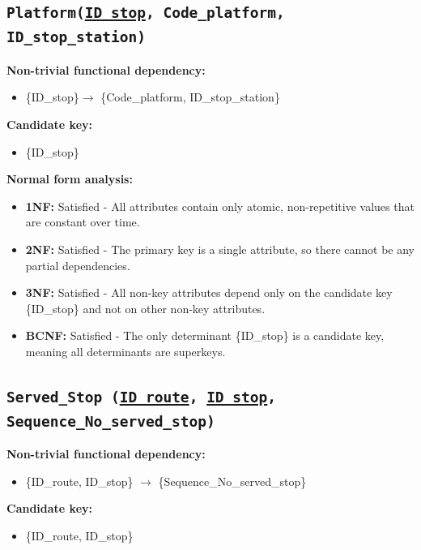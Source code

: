 \documentclass[a4paper, 12pt]{article}
\begin{document}
\subsection{\texttt{{Platform}(\underline{ID\_stop}, Code\_platform, ID\_stop\_station)}}
\textbf{Non-trivial functional dependency:}
\begin{itemize}
    \item \{ID\_stop\}$\rightarrow$ \{Code\_platform, ID\_stop\_station\}
\end{itemize}

\textbf{Candidate key:}
\begin{itemize}
    \item \{ID\_stop\}
\end{itemize}

\textbf{Normal form analysis:}
\begin{itemize}
    \item \textbf{1NF:} Satisfied - All attributes contain only atomic, non-repetitive values that are constant over time.
    
    \item \textbf{2NF:} Satisfied - The primary key is a single attribute, so there cannot be any partial dependencies.
    
    \item \textbf{3NF:} Satisfied - All non-key attributes depend only on the candidate key \{ID\_stop\} and not on other non-key attributes.
    
    \item \textbf{BCNF:} Satisfied - The only determinant \{ID\_stop\} is a candidate key, meaning all determinants are superkeys.
\end{itemize}

\subsection{\texttt{{Served\_Stop} (\underline{ID\_route}, \underline{ID\_stop}, Sequence\_No\_served\_stop)}}
\textbf{Non-trivial functional dependency:}
\begin{itemize}
    \item \{ID\_route, ID\_stop\} $\rightarrow$ \{Sequence\_No\_served\_stop\}
\end{itemize}

\textbf{Candidate key:}
\begin{itemize}
    \item \{ID\_route, ID\_stop\}
\end{itemize}
\end{document}
